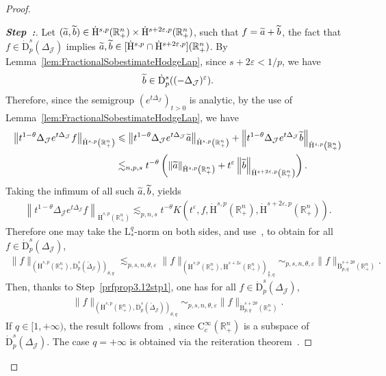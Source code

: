 \documentclass[10pt]{amsart}
\theoremstyle{definition}\newtheorem{defi}[theo]{Definition}\newtheorem{rema}[theo]{Remark}\newtheorem{exam}[theo]{Example}\newtheorem{exem}[theo]{Example}\newtheorem{nota}[theo]{Notation}
\newcommand{\bbR}{\mathbb{R}}
\newcommand{\rmH}{\mathrm{H}}%
\newcommand{\rmB}{\mathrm{B}}
\newcommand{\rmD}{\mathrm{D}}
\newcommand{\rmL}{\mathrm{L}}
\newcommand{\rmC}{\mathrm{C}}
\newcommand{\clJ}{\mathcal{J}}
\newcounter{stepcount}
\newenvironment{step}{\refstepcounter{stepcount}\begin{proof}[\textbf{Step~\thestepcount:}]}{\let\qed\relax\end{proof}}
\let\oldtilde\tilde
\renewcommand*{\tilde}[1]{\mathchoice{\widetilde{#1}}{\widetilde{#1}}{\oldtilde{#1}}{\oldtilde{#1}}}
\begin{document}
\begin{proof}
\begin{step}
Let $(\tilde{a},\tilde{b})\in\dot{\rmH}^{s,p}(\bbR^n_+)\times\dot{\rmH}^{s+2\varepsilon,p}(\bbR^n_+)$, such that $f=\tilde{a}+\tilde{b}$, the fact that $f\in \dot{\rmD}^{s}_{p}({{\Delta}}_{\clJ})$ implies $\tilde{a},\tilde{b}\in [\dot{\rmH}^{s,p}\cap\dot{\rmH}^{s+2\varepsilon,p}](\bbR^n_+)$. By Lemma~\ref{lem:FractionalSobestimateHodgeLap}, since $s+2\varepsilon<1/p$, we have
\begin{align*}
\tilde{b} \in \dot{\rmD}^{s}_{p}((-{{\Delta}}_{\clJ})^\varepsilon).
\end{align*}
Therefore, since the semigroup $(e^{t\Delta_\clJ})_{t>0}$ is analytic, by the use of Lemma~\ref{lem:FractionalSobestimateHodgeLap}, we have
\begin{align*}
\left\| t^{1-\theta} \Delta_{\clJ}e^{t\Delta_{\clJ}} f\right \|_{\dot{\rmH}^{s,p}\left(\bbR^n_+\right)} &\leqslant \left \| t^{1-\theta} \Delta_{\clJ}e^{t\Delta_{\clJ}} \tilde{a}\right \|_{\dot{\rmH}^{s,p}\left(\bbR^n_+\right)} + \left \| t^{1-\theta} \Delta_{\clJ}e^{t\Delta_{\clJ}} \tilde{b}\right \|_{\dot{\rmH}^{s,p}\left(\bbR^n_+\right)}\\
&\lesssim_{n,p,s} t^{-\theta} \left(\left \| \tilde{a}\right\|_{\dot{\rmH}^{s,p}\left(\bbR^n_+\right)} + t^{\varepsilon} \left\| \tilde{b}\right\|_{\dot{\rmH}^{s+2\varepsilon,p}\left(\bbR^n_+\right)}\right).
\end{align*}
Taking the infimum of all such $\tilde{a},\tilde{b}$, yields
\begin{align*}
\left \| t^{1-\theta} \Delta_{\clJ}e^{t\Delta_{\clJ}} f\right\|_{\dot{\rmH}^{s,p}\left(\bbR^n_+\right)} \lesssim_{p,n,s} t^{-\theta}K\left (t^{\varepsilon},f,\dot{\rmH}^{s,p}\left(\bbR^n_+\right),\dot{\rmH}^{s+2\varepsilon,p}\left(\bbR^n_+\right)\right).
\end{align*}
Therefore one may take the $\rmL^q_{\ast}$-norm on both sides, and use~\cite[Proposition~3.17]{Gaudin2022}, to obtain for all $f\in \dot{\rmD}^{s}_{p}({{\Delta}}_{\clJ})$,
\begin{align*}
\| f \|_{\left(\dot{\rmH}^{s,p}\left(\bbR^n_+\right),\dot{\rmD}^{s}_{p}\left(\mathring{\Delta}_\clJ\right)\right)_{\theta,q}}\lesssim_{p,s,n,\theta,\varepsilon} \| f \|_{\left(\dot{\rmH}^{s,p}\left(\bbR^n_+\right),\dot{\rmH}^{s+2\varepsilon}\left(\bbR^n_+\right)\right)_{\frac{\theta}{\varepsilon},q}} \sim_{p,s,n,\theta,\varepsilon} \| f \|_{\dot{\rmB}^{s+2\theta}_{p,q}\left(\bbR^n_+\right)}.
\end{align*}
Then, thanks to Step~\ref{prfprop3.12stp1}, one has for all $f\in \dot{\rmD}^{s}_{p}({{\Delta}}_{\clJ})$,
\begin{align*}
\| f \|_{\left(\dot{\rmH}^{s,p}\left(\bbR^n_+\right),\dot{\rmD}^{s}_{p}(\mathring{\Delta}_\clJ)\right)_{\theta,q}}\sim_{p,s,n,\theta,\varepsilon} \| f \|_{\dot{\rmB}^{s+2\theta}_{p,q}\left(\bbR^n_+\right)}.
\end{align*}
If $q\in[1,+\infty)$, the result follows from~\cite[Corollary~3.18]{Gaudin2022}, since $\rmC _c^\infty(\bbR^n_+)$ is a subspace of $\dot{\rmD}^{s}_{p}({{\Delta}}_{\clJ})$. The case $q=+\infty$ is obtained via the reiteration theorem~\cite[Theorem~3.5.3]{BerghLofstrom1976}.
\end{step}


\end{proof}
\end{document}
